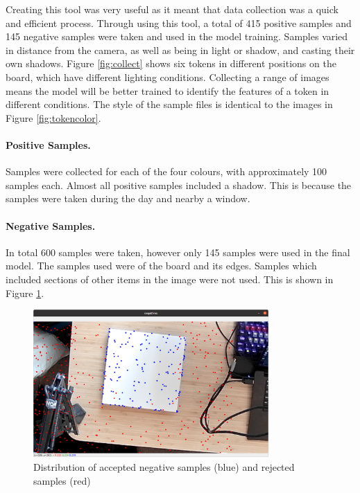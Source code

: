 \documentclass[12pt]{article}
\begin{document}
Creating this tool was very useful as it meant that data collection was a quick and efficient process. 
Through using this tool, a total of 415 positive samples and 145 negative samples were taken and used in the model training.
Samples varied in distance from the camera, as well as being in light or shadow, and casting their own shadows. 
Figure \ref{fig:collect} shows six tokens in different positions on the board, which have different lighting conditions. 
Collecting a range of images means the model will be better trained to identify the features of a token in different conditions.
The style of the sample files is identical to the images in Figure \ref{fig:tokencolor}.

\paragraph{Positive Samples.} Samples were collected for each of the four colours, with approximately 100 samples each. 
Almost all positive samples included a shadow. 
This is because the samples were taken during the day and nearby a window. 

\paragraph{Negative Samples.} In total 600 samples were taken, however only 145 samples were used in the final model. 
The samples used were of the board and its edges. 
Samples which included sections of other items in the image were not used. 
This is shown in Figure \ref{fig:negatives}.

\begin{figure}[h]
    \centering
    \includegraphics[width=0.8\textwidth]{images/figures/fig12}
    \caption[Distribution of accepted negative samples and rejected samples]{Distribution of accepted negative samples (blue) and rejected samples (red)}
    \label{fig:negatives}
\end{figure}
\end{document}
